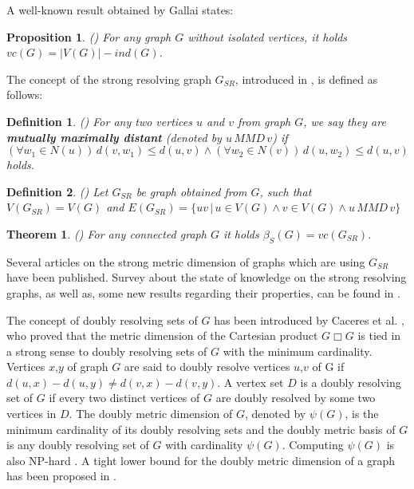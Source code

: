 \documentclass[preprint,12pt]{elsarticle}
\newtheorem{dfn}{Definition}
\newtheorem{thm}{Theorem}
\newtheorem{pro}{Proposition}
\begin{document}
A well-known result obtained by Gallai \cite{vc1} states:

\begin{pro} \label{vc1a} \mbox{\rm(\cite{vc1})} For any graph $G$ without isolated vertices, it holds 
$vc(G) = |V(G)| - ind(G)$.
 \end{pro}

The concept of the strong resolving graph $G_{SR}$, introduced in \cite{smetd2}, is defined as follows: 

\begin{dfn} \label{gsr1a} \mbox{\rm(\cite{smetd2})} For any two vertices $u$ and $v$ from graph $G$, we say they are 
{\bf mutually maximally distant} (denoted by $u \, MMD \, v$) if 
$$(\forall w_1 \in N(u)) \, d(v,w_1) \le d(u,v) \wedge (\forall  w_2 \in N(v)) \, d(u,w_2) \le d(u,v)$$ holds. 
\end{dfn} 

\begin{dfn} \label{gsr1b} \mbox{\rm(\cite{smetd2})} Let $G_{SR}$ be graph obtained from $G$, such that \; 
$V(G_{SR}) = V(G)$ and $E(G_{SR}) = \{ uv \,|\, u \in V(G) \wedge v \in V(G) \wedge u \, MMD \, v\}$ 
\end{dfn}  

\begin{thm} \label{gsr1} \mbox{\rm(\cite{smetd2})} For any connected graph $G$ it holds $\beta_S(G) = vc(G_{SR})$.
 \end{thm}

Several articles on the strong metric dimension of graphs which are using $G_{SR}$ have been published.
Survey about the state of knowledge on the strong resolving graphs, as well as, some new results
regarding their properties, can be found in \cite{kuz18}. 

The concept of doubly resolving sets of $G$ has been introduced by Caceres et al. \cite{dmetd}, 
who proved that the metric dimension of the Cartesian product $G \Box G$ is tied in a strong sense 
to doubly resolving sets of $G$ with the minimum cardinality. Vertices $x$,$y$ of graph $G$ are 
said to doubly resolve vertices $u$,$v$ of G if $d(u,x)-d(u,y) \ne d(v,x)-d(v,y)$. A vertex set $D$ 
is a doubly resolving set of $G$ if every two distinct vertices of $G$ are doubly resolved by 
some two vertices in $D$. The doubly metric dimension of $G$, denoted by $\psi(G)$, is the minimum cardinality 
of its doubly resolving sets and the doubly metric basis of $G$ is any doubly resolving set of $G$ 
with cardinality $\psi(G)$. Computing $\psi(G)$ is also NP-hard \cite{ilpd}. A tight lower bound for the
doubly metric dimension of a graph has been proposed in \cite{kra26}.
\end{document}
